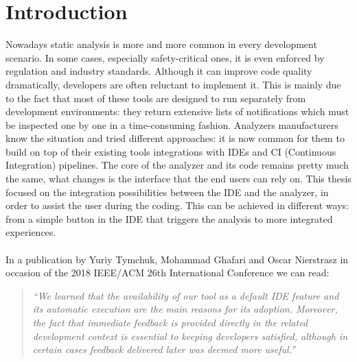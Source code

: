 \chapter*{Introduction} %
Nowadays static analysis is more and more common in every development scenario. In some cases, especially safety-critical ones, it is even enforced by regulation and industry standards. Although it can improve code quality dramatically, developers are often reluctant to implement it. This is mainly due to the fact that most of these tools are designed to run separately from development environments: they return extensive lists of notifications which must be inspected one by one in a time-consuming fashion. 
Analyzers manufacturers know the situation and tried different approaches: it is now common for them to build on top of their existing tools integrations with IDEs and CI (Continuous Integration) pipelines.
The core of the analyzer and its code remains pretty much the same, what changes is the interface that the end users can rely on.
This thesis focused on the integration possibilities between the IDE and the analyzer, in order to assist the user during the coding.
This can be achieved in different ways: from a simple button in the IDE that triggers the analysis to more integrated experiences.
\\\\
In a publication by Yuriy Tymchuk, Mohammad Ghafari and Oscar Nierstrasz in occasion of the 2018 IEEE/ACM 26th International Conference we can read:
\begin{quote}
\itshape
``We learned that the availability of our tool as a default IDE feature and its automatic execution are the main reasons for its adoption. Moreover, the fact that immediate feedback is provided directly in the related development context is essential to keeping developers satisfied, although in certain cases feedback delivered later was deemed more useful.'' \cite{8973102}
\end{quote}

